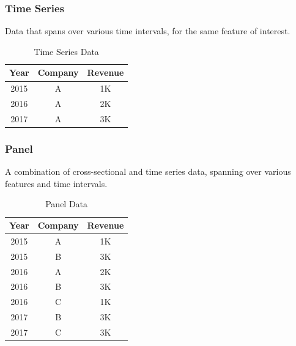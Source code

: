 \documentclass[
  english,
  doc,floatsintext]{apa6}
\begin{document}
\hypertarget{time-series}{%
\subsubsection{Time Series}\label{time-series}}

Data that spans over various time intervals, for the same feature of interest.

\begin{table}[H]
  \begin{center}
  \begin{tabular}{|c|c|c|}
  \hline
  \textbf{Year} & \textbf{Company} & \textbf{Revenue} \\ \hline
  2015 & A       & 1K      \\ \hline
  2016 & A       & 2K      \\ \hline
  2017 & A       & 3K      \\ \hline
  \end{tabular}
  \end{center}
  
  \captionsetup{justification=centering}
  \caption{Time Series Data}
\end{table}

\hypertarget{panel}{%
\subsubsection{Panel}\label{panel}}

A combination of cross-sectional and time series data, spanning over various features and time intervals.

\begin{table}[H]
  \begin{center}
  \begin{tabular}{|c|c|c|}
  \hline
  \textbf{Year} & \textbf{Company} & \textbf{Revenue} \\ \hline
  2015 & A       & 1K      \\ \hline
  2015 & B       & 3K      \\ \hline
  2016 & A       & 2K      \\ \hline
  2016 & B       & 3K      \\ \hline
  2016 & C       & 1K      \\ \hline
  2017 & B       & 3K      \\ \hline
  2017 & C       & 3K      \\ \hline
  \end{tabular}
  \end{center}
  
  \captionsetup{justification=centering}
  \caption{Panel Data}
\end{table}
\end{document}
